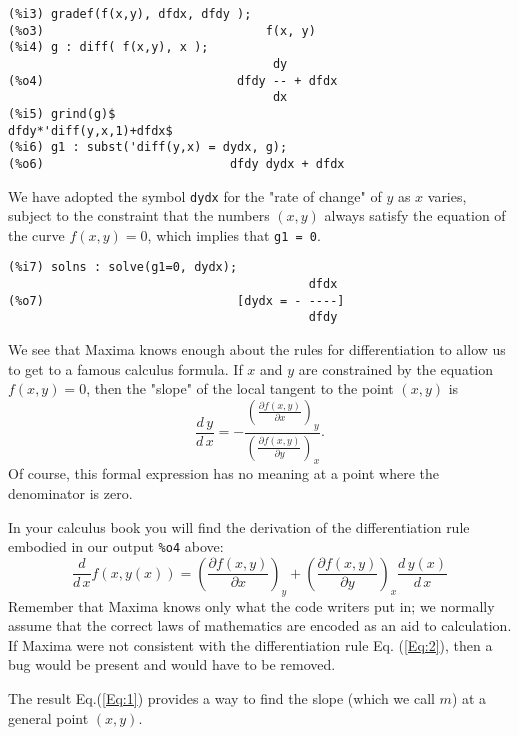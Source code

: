 \documentclass[12pt]{article}
\begin{document}
\small
\begin{verbatim}
(%i3) gradef(f(x,y), dfdx, dfdy );
(%o3)                               f(x, y)
(%i4) g : diff( f(x,y), x );
                                     dy
(%o4)                           dfdy -- + dfdx
                                     dx
(%i5) grind(g)$
dfdy*'diff(y,x,1)+dfdx$
(%i6) g1 : subst('diff(y,x) = dydx, g);
(%o6)                          dfdy dydx + dfdx
\end{verbatim}
\normalsize
We have adopted the symbol \verb|dydx| for the "rate of change" of $y$ as $x$ varies,
  subject to the constraint that the numbers $(x,y)$ always satisfy the equation of
  the curve $f(x,y) = 0$, which implies that \verb|g1 = 0|.
\small
\begin{verbatim}
(%i7) solns : solve(g1=0, dydx);
                                          dfdx
(%o7)                           [dydx = - ----]
                                          dfdy
\end{verbatim}
\normalsize
We see that Maxima knows enough about the rules for differentiation to
  allow us to get to a famous calculus formula.
If $x$ and $y$ are constrained by the equation $f(x,y) = 0$, then the "slope" of
  the local tangent to the point $(x,y)$ is 
\begin{equation} \label{Eq:1}
 \frac{d\,y}{d\,x} = - \frac{\left(\frac{\partial f(x,y)}{\partial x}  \right)_{y} }{
                        \left(\frac{\partial f(x,y)}{\partial y}  \right)_{x} }.  
\end{equation}						
Of course, this formal expression has no meaning at a point where the denominator
  is zero.

\smallskip
In your calculus book you will find the derivation of the differentiation 
  rule embodied in our output \verb|%o4| above:
\begin{equation}  \label{Eq:2}
\frac{d}{d\,x} f(x,y(x)) = \left(\frac{\partial f(x,y)}{\partial x}  \right)_{y} +
        \left(\frac{\partial f(x,y)}{\partial y}  \right)_{x} \frac{d\,y(x)}{d\,x}
\end{equation}  
Remember that Maxima knows only what the code writers put in; we normally assume
  that the correct laws of mathematics are encoded as an aid to calculation.
If Maxima were not consistent with the differentiation rule Eq. (\ref{Eq:2}),
  then a bug would be present and would have to be removed.
\smallskip
  

\smallskip
The result Eq.(\ref{Eq:1}) provides a way to find the slope (which we call $m$)
 at a general point $(x,y)$.
 
\end{document}
